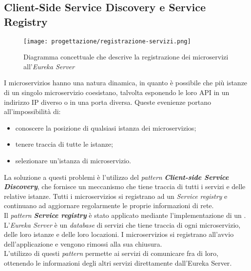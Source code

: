 \subsection{Client-Side Service Discovery e Service Registry}
\label{sub:ServiceRegistry}
\begin{figure}[H]
    \centering
    \texttt{[image: progettazione/registrazione-servizi.png]}
    \caption{Diagramma concettuale che descrive la registrazione dei
        microservizi all'\textit{Eureka Server}}
\end{figure}
I \glspl{microservizio} hanno una natura dinamica, in quanto è possibile che
più istanze di un singolo \gls{microservizio} coesistano, talvolta
esponendo le loro \gls{API} in un indirizzo \gls{IP} diverso o in una porta
diversa. Queste evenienze portano all'impossibilità di:
\begin{itemize}
    \item conoscere la posizione di qualsiasi istanza dei
          \glspl{microservizio};
    \item tenere traccia di tutte le istanze;
    \item selezionare un'istanza di \gls{microservizio}.
\end{itemize}
La soluzione a questi problemi è l'utilizzo del \textit{pattern}
\textbf{\textit{Client-side Service Discovery}}, che fornisce un meccanismo che
tiene traccia di tutti i servizi e delle relative istanze. Tutti i
\glspl{microservizio} si registrano ad un \textit{Service registry} e
continuano ad aggiornare regolarmente le proprie informazioni di
rete.\cite{site-spring-boot-microservizi}\\
Il \textit{pattern} \textbf{\textit{Service registry}} è stato applicato
mediante l'implementazione di un . L'\textit{Eureka
    Server} è un \textit{database} di servizi che tiene traccia di ogni
\gls{microservizio}, delle loro istanze e delle loro locazioni. I
\glspl{microservizio} si registrano all'avvio dell'applicazione e vengono
rimossi alla sua chiusura.\\
L'utilizzo di questi \textit{pattern}  permette ai servizi di comunicare fra di
loro, ottenendo le informazioni degli altri servizi direttamente
dall'\gls{Eureka Server}.\cite{site-service-registry}
